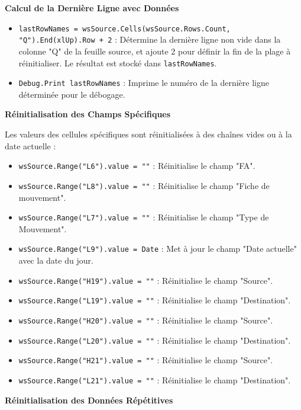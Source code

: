 \documentclass[a4paper, oneside, 12pt, final]{extreport}
\begin{document}
\textbf{Calcul de la Dernière Ligne avec Données}

\begin{itemize}
    \item \texttt{lastRowNames = wsSource.Cells(wsSource.Rows.Count, "Q").End(xlUp).Row + 2} : Détermine la dernière ligne non vide dans la colonne "Q" de la feuille source, et ajoute 2 pour définir la fin de la plage à réinitialiser. Le résultat est stocké dans \texttt{lastRowNames}.
    \item \texttt{Debug.Print lastRowNames} : Imprime le numéro de la dernière ligne déterminée pour le débogage.
\end{itemize}

\textbf{Réinitialisation des Champs Spécifiques}

Les valeurs des cellules spécifiques sont réinitialisées à des chaînes vides ou à la date actuelle :

\begin{itemize}
    \item \texttt{wsSource.Range("L6").value = ""} : Réinitialise le champ "FA".
    \item \texttt{wsSource.Range("L8").value = ""} : Réinitialise le champ "Fiche de mouvement".
    \item \texttt{wsSource.Range("L7").value = ""} : Réinitialise le champ "Type de Mouvement".
    \item \texttt{wsSource.Range("L9").value = Date} : Met à jour le champ "Date actuelle" avec la date du jour.
    \item \texttt{wsSource.Range("H19").value = ""} : Réinitialise le champ "Source".
    \item \texttt{wsSource.Range("L19").value = ""} : Réinitialise le champ "Destination".
    \item \texttt{wsSource.Range("H20").value = ""} : Réinitialise le champ "Source".
    \item \texttt{wsSource.Range("L20").value = ""} : Réinitialise le champ "Destination".
    \item \texttt{wsSource.Range("H21").value = ""} : Réinitialise le champ "Source".
    \item \texttt{wsSource.Range("L21").value = ""} : Réinitialise le champ "Destination".
\end{itemize}

\textbf{Réinitialisation des Données Répétitives}
\end{document}
